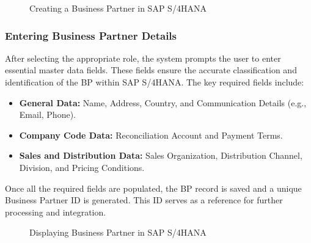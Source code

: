     \begin{figure}[H]
    \centering
    \caption{Creating a Business Partner in SAP S/4HANA}
    
    \end{figure}

\subsubsection{Entering Business Partner Details}
After selecting the appropriate role, the system prompts the user to enter essential master data fields. These fields ensure the accurate classification and identification of the BP within SAP S/4HANA. The key required fields include:

\begin{itemize}
    \item \textbf{General Data:} Name, Address, Country, and Communication Details (e.g., Email, Phone).
    \item \textbf{Company Code Data:} Reconciliation Account and Payment Terms.
    \item \textbf{Sales and Distribution Data:} Sales Organization, Distribution Channel, Division, and Pricing Conditions.
\end{itemize}

Once all the required fields are populated, the BP record is saved and a unique Business Partner ID is generated. This ID serves as a reference for further processing and integration.


    \begin{figure}[H]
    \centering
    \caption{Displaying Business Partner in SAP S/4HANA}
    
    \end{figure}

